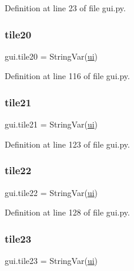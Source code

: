 Definition at line 23 of file gui.\+py.

\mbox{\label{namespacegui_a2096e825e084bbcf0aa95f3d23080035}} 
\subsubsection{\texorpdfstring{tile20}{tile20}}
{\footnotesize\ttfamily gui.\+tile20 = String\+Var(\mbox{\hyperlink{namespacegui_a40ab7281456eadbea2dc2038f5c24fa1}{ui}})}



Definition at line 116 of file gui.\+py.

\mbox{\label{namespacegui_a498c43445669c1b252d5fcaab91b94d1}} 
\subsubsection{\texorpdfstring{tile21}{tile21}}
{\footnotesize\ttfamily gui.\+tile21 = String\+Var(\mbox{\hyperlink{namespacegui_a40ab7281456eadbea2dc2038f5c24fa1}{ui}})}



Definition at line 123 of file gui.\+py.

\mbox{\label{namespacegui_a70aa21cb6ac54c9f4b78b33bb1b2a950}} 
\subsubsection{\texorpdfstring{tile22}{tile22}}
{\footnotesize\ttfamily gui.\+tile22 = String\+Var(\mbox{\hyperlink{namespacegui_a40ab7281456eadbea2dc2038f5c24fa1}{ui}})}



Definition at line 128 of file gui.\+py.

\mbox{\label{namespacegui_afd8283fde2bbc574d953eeedbcfdcedb}} 
\subsubsection{\texorpdfstring{tile23}{tile23}}
{\footnotesize\ttfamily gui.\+tile23 = String\+Var(\mbox{\hyperlink{namespacegui_a40ab7281456eadbea2dc2038f5c24fa1}{ui}})}



